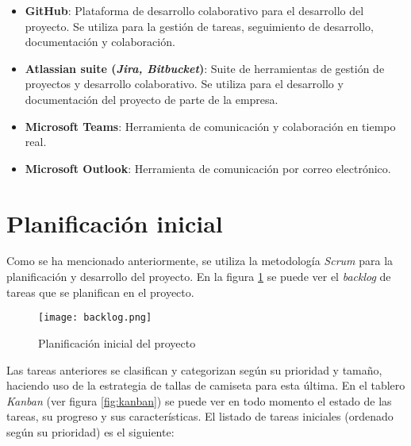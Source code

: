 \begin{itemize}
	\item \textbf{GitHub}: Plataforma de desarrollo colaborativo para el desarrollo del proyecto.
		Se utiliza para la gestión de tareas, seguimiento de desarrollo, documentación y
		colaboración.
	\item \textbf{Atlassian suite (\emph{Jira, Bitbucket})}: Suite de herramientas de gestión de proyectos
		y desarrollo colaborativo. Se utiliza para el desarrollo y documentación del proyecto de
		parte de la empresa.
	\item \textbf{Microsoft Teams}: Herramienta de comunicación y colaboración en tiempo real.
	\item \textbf{Microsoft Outlook}: Herramienta de comunicación por correo electrónico.
\end{itemize}

\newpage{}
\section{Planificación inicial}\label{sec:planif_inicial}
Como se ha mencionado anteriormente, se utiliza la metodología \textit{Scrum} para la planificación
y desarrollo del proyecto. En la figura \ref{fig:backlog} se puede ver el \textit{backlog}
de tareas que se planifican en el proyecto.

\begin{figure}[H]
	\centering
	\texttt{[image: backlog.png]}
	\caption{Planificación inicial del proyecto}
	\label{fig:backlog}
\end{figure}

Las tareas anteriores se clasifican y categorizan según su prioridad y tamaño, haciendo uso de la
estrategia de tallas de camiseta para esta última. En el tablero \textit{Kanban} (ver figura
\ref{fig:kanban}) se puede ver en todo momento el estado de las tareas, su progreso y sus
características. El listado de tareas iniciales (ordenado según su prioridad) es el siguiente:

